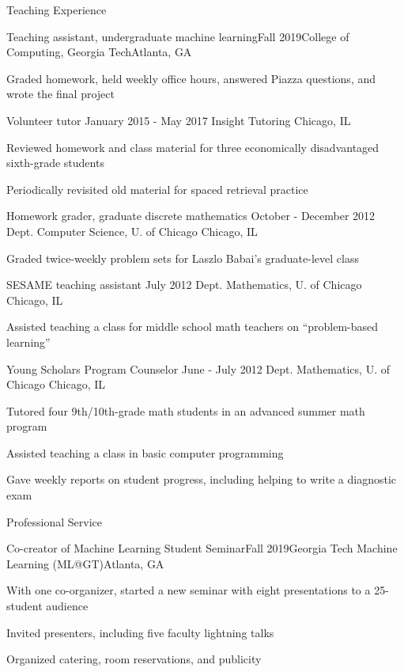 \documentclass{resume} %
\begin{document}
\begin{rSection}{Teaching Experience}
\begin{rSubsection}{Teaching assistant, undergraduate machine learning}{Fall 2019}{College of Computing, Georgia Tech}{Atlanta, GA}
\item Graded homework, held weekly office hours, answered Piazza questions, and wrote the final project
\end{rSubsection}
\begin{rSubsection}{Volunteer tutor}{ January 2015 - May 2017}{ Insight Tutoring}{ Chicago, IL}
\item Reviewed homework and class material for three economically disadvantaged sixth-grade students
\item Periodically revisited old material for spaced retrieval practice
\end{rSubsection}
\begin{rSubsection}{Homework grader, graduate discrete mathematics}{ October - December 2012}{ Dept. Computer Science, U. of Chicago}{ Chicago, IL}
\item Graded twice-weekly problem sets for Laszlo Babai's graduate-level class
\end{rSubsection}
\begin{rSubsection}{ SESAME teaching assistant}{ July 2012}{ Dept. Mathematics, U. of Chicago}{ Chicago, IL}
\item Assisted teaching a class for middle school math teachers on ``problem-based learning''
\end{rSubsection}
\begin{rSubsection}{ Young Scholars Program Counselor}{ June - July 2012}{ Dept. Mathematics, U. of Chicago}{ Chicago, IL}
\item Tutored four 9th/10th-grade math students in an advanced summer math program
\item Assisted teaching a class in basic computer programming
\item Gave weekly reports on student progress, including helping to write a diagnostic exam
\end{rSubsection}
\end{rSection}

\begin{rSection}{Professional Service}
\begin{rSubsection}{Co-creator of Machine Learning Student Seminar}{Fall 2019}{Georgia Tech Machine Learning (ML@GT)}{Atlanta, GA}
\item With one co-organizer, started a new seminar with eight presentations to a 25-student audience
\item Invited presenters, including five faculty lightning talks
\item Organized catering, room reservations, and publicity
\end{rSubsection}
\end{rSection}
\end{document}
